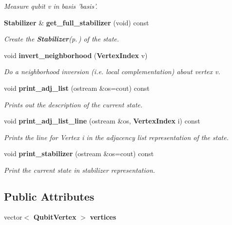 \begin{CompactItemize}
\begin{CompactList}\small\item\em Measure qubit v in basis 'basis'. \item\end{CompactList}\item 
{\bf Stabilizer} \& {\bf get\_\-full\_\-stabilizer} (void) const 
\begin{CompactList}\small\item\em Create the {\bf Stabilizer}{\rm (p.\,\pageref{structStabilizer})} of the state. \item\end{CompactList}\item 
void {\bf invert\_\-neighborhood} ({\bf Vertex\-Index} v)\label{classGraphRegister_a12}

\begin{CompactList}\small\item\em Do a neighborhood inversion (i.e. local complementation) about vertex v. \item\end{CompactList}\item 
void {\bf print\_\-adj\_\-list} (ostream \&os=cout) const 
\begin{CompactList}\small\item\em Prints out the description of the current state. \item\end{CompactList}\item 
void {\bf print\_\-adj\_\-list\_\-line} (ostream \&os, {\bf Vertex\-Index} i) const \label{classGraphRegister_a14}

\begin{CompactList}\small\item\em Prints the line for Vertex i in the adjacency list representation of the state. \item\end{CompactList}\item 
void {\bf print\_\-stabilizer} (ostream \&os=cout) const \label{classGraphRegister_a15}

\begin{CompactList}\small\item\em Print the current state in stabilizer representation. \item\end{CompactList}\end{CompactItemize}
\subsection*{Public Attributes}
\begin{CompactItemize}
\item 
vector$<$ {\bf Qubit\-Vertex} $>$ {\bf vertices}
\end{CompactItemize}


